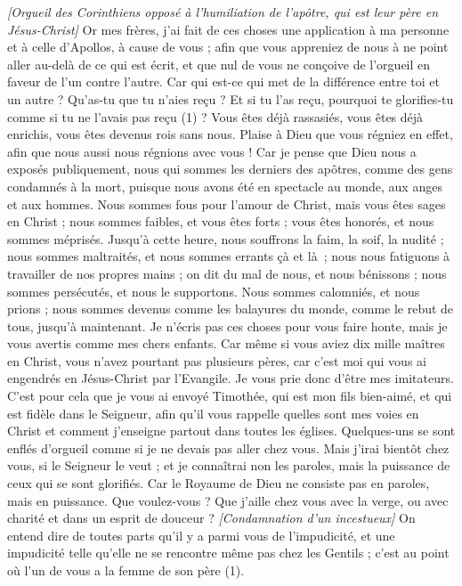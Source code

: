 \begin{multicols}{2}
\textit{[Orgueil des Corinthiens opposé à l'humiliation de l'apôtre, qui est leur père en Jésus-Christ]}
Or mes frères, j’ai fait de ces choses une application à ma personne et à celle d’Apollos, à cause de vous ; afin que vous appreniez de nous à ne point aller au-delà de ce qui est écrit, et que nul de vous ne conçoive de l’orgueil en faveur de l’un contre l’autre.
Car qui est-ce qui met de la différence entre toi et un autre ? Qu’as-tu que tu n’aies reçu ? Et si tu l'as reçu, pourquoi te glorifies-tu comme si tu ne l'avais pas reçu (1) ?
Vous êtes déjà rassasiés, vous êtes déjà enrichis, vous êtes devenus rois sans nous. Plaise à Dieu que vous régniez en effet, afin que nous aussi nous régnions avec vous !
Car je pense que Dieu nous a exposés publiquement, nous qui sommes les derniers des apôtres, comme des gens condamnés à la mort, puisque nous avons été en spectacle au monde, aux anges et aux hommes.
Nous sommes fous pour l'amour de Christ, mais vous êtes sages en Christ ; nous sommes faibles, et vous êtes forts ; vous êtes honorés, et nous sommes méprisés.
Jusqu'à cette heure, nous souffrons la faim, la soif, la nudité ; nous sommes maltraités, et nous sommes errants çà et là ;
nous nous fatiguons à travailler de nos propres mains ; on dit du mal de nous, et nous bénissons ; nous sommes persécutés, et nous le supportons.
Nous sommes calomniés, et nous prions ; nous sommes devenus comme les balayures du monde, comme le rebut de tous, jusqu'à maintenant.
Je n'écris pas ces choses pour vous faire honte, mais je vous avertis comme mes chers enfants.
Car même si vous aviez dix mille maîtres en Christ, vous n'avez pourtant pas plusieurs pères, car c'est moi qui vous ai engendrés en Jésus-Christ par l'Evangile.
Je vous prie donc d'être mes imitateurs.
C'est pour cela que je vous ai envoyé Timothée, qui est mon fils bien-aimé, et qui est fidèle dans le Seigneur, afin qu'il vous rappelle quelles sont mes voies en Christ et comment j'enseigne partout dans toutes les églises.
Quelques-uns se sont enflés d’orgueil comme si je ne devais pas aller chez vous.
Mais j'irai bientôt chez vous, si le Seigneur le veut ; et je connaîtrai non les paroles, mais la puissance de ceux qui se sont glorifiés.
Car le Royaume de Dieu ne consiste pas en paroles, mais en puissance.
Que voulez-vous ? Que j’aille chez vous avec la verge, ou avec charité et dans un esprit de douceur ?
\textit{[Condamnation d'un incestueux]}
\VerseOne{}On entend dire de toutes parts qu'il y a parmi vous de l’impudicité, et une impudicité telle qu’elle ne se rencontre même pas chez les Gentils ; c'est au point où l’un de vous a la femme de son père (1).

\end{multicols}
